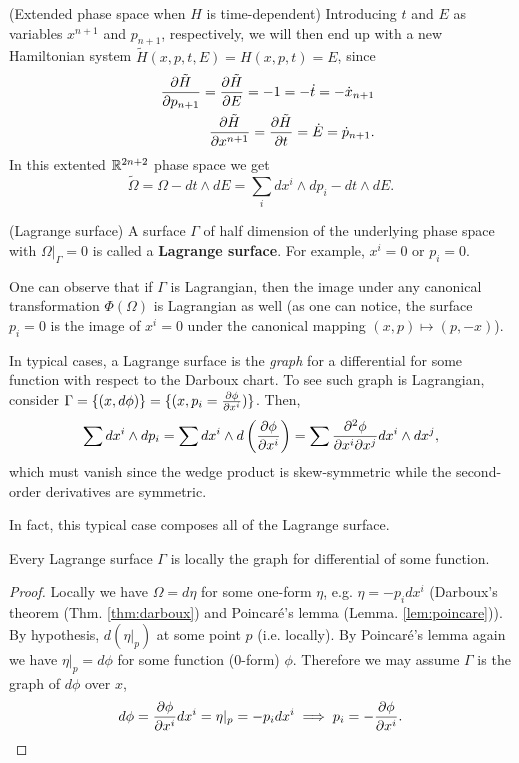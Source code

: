 \begin{definition}
	(Extended phase space when $H$ is time-dependent) Introducing $t$ and $E$ as variables $x^{n+1}$ and $p_{n+1}$, respectively, we will then end up with a new Hamiltonian system $\tilde{H}(x, p, t, E) = H(x, p, t) = E$, since
	\begin{eqnarray}
		&&\frac{ \partial \tilde{H}}{ \partial p_{n+1} } = \frac{ \partial \tilde{H}}{ \partial E } = -1 = -\dot{t} = -\dot{x}_{n+1}
		\nonumber\\
		&&\frac{ \partial \tilde{H}}{ \partial x^{n+1} } = \frac{ \partial \tilde{H}}{ \partial t } = \dot{E} = \dot{p}_{n+1}.
		\nonumber
	\end{eqnarray}
	In this extented $\mathbb{R}^{2n+2}$ phase space we get
	\[ \tilde{\Omega} = \Omega - dt \wedge dE = \sum_i dx^i \wedge dp_i - dt \wedge dE. \]
\end{definition}

\begin{definition}
	(Lagrange surface) A surface $\Gamma$ of half dimension of the underlying phase space with $\Omega|_{\Gamma} = 0$ is called a \textbf{Lagrange surface}. For example, $x^i = 0$ or $p_i = 0$.
\end{definition}
One can observe that if $\Gamma$ is Lagrangian, then the image under any canonical transformation $\Phi(\Omega)$ is Lagrangian as well (as one can notice, the surface $p_i = 0$ is the image of $x^i = 0$ under the canonical mapping $(x, p) \mapsto (p, -x)$).

In typical cases, a Lagrange surface is the \emph{graph} for a differential for some function with respect to the Darboux chart. To see such graph is Lagrangian, consider $\Gamma = \{(x, d\phi)\} = \{(x, p_i = \frac{ \partial \phi}{ \partial x^i })\}$. Then,
\[\sum dx^i \wedge dp_i = \sum dx^i \wedge d\left(\frac{ \partial \phi}{ \partial x^i }\right) = \sum \frac{\partial^2 \phi}{\partial x^i \partial x^j} dx^i \wedge dx^j, \]
which must vanish since the wedge product is skew-symmetric while the second-order derivatives are symmetric.

In fact, this typical case composes all of the Lagrange surface.
\begin{theorem}
	Every Lagrange surface $\Gamma$ is locally the graph for differential of some function.
\end{theorem}
\begin{proof}
	Locally we have $\Omega = d\eta$ for some one-form $\eta$, e.g. $\eta = -p_i dx^i$ (Darboux's theorem (Thm. \ref{thm:darboux}) and Poincar\'{e}'s lemma (Lemma. \ref{lem:poincare})). By hypothesis, $d(\eta|_p)$ at some point $p$ (i.e. locally). By Poincar\'{e}'s lemma again we have $\eta|_p = d\phi$ for some function (0-form) $\phi$. Therefore we may assume $\Gamma$ is the graph of $d\phi$ over $x$,
	\[ d\phi = \frac{ \partial \phi}{ \partial x^i } dx^i = \eta|_p  = -p_i dx^i \implies p_i = - \frac{ \partial \phi}{ \partial x^i }. \] 
\end{proof}

